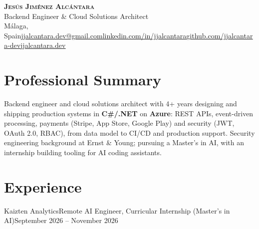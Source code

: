 \documentclass[a4paper,10pt]{article}
\begin{document}
\begin{center}
    \textbf{\Huge \scshape Jesús Jiménez Alcántara} \\ \vspace{2pt}
    {\large Backend Engineer \& Cloud Solutions Architect}\hspace{0.6em}{\textbar}\hspace{0.6em}{\normalsize .NET $\cdot$ Azure $\cdot$ DevOps $\cdot$ AI} \\ \vspace{3pt}
    {\footnotesize Málaga, Spain\cvsep\cvphoneitem\href{mailto:jjalcantara.dev@gmail.com}{\underline{jjalcantara.dev@gmail.com}}\cvsep\href{https://linkedin.com/in/jjalcantara}{\underline{linkedin.com/in/jjalcantara}}\cvsep\href{https://github.com/jjalcantara-dev}{\underline{github.com/jjalcantara-dev}}\cvsep\href{https://jjalcantara.dev}{\underline{jjalcantara.dev}}}
\end{center}

\vspace{-6pt}

\section{Professional Summary}
\small
Backend engineer and cloud solutions architect with 4+ years designing and shipping production systems in \textbf{C\#/.NET} on
\textbf{Azure}: REST APIs, event-driven processing, payments (Stripe, App Store, Google Play) and security (JWT, OAuth 2.0, RBAC),
from data model to CI/CD and production support. Security engineering background at Ernst \& Young; pursuing a Master's in AI,
with an internship building tooling for AI coding assistants.

\vspace{-2pt}

\section{Experience}
  \resumeSubHeadingListStart

    \resumeSubheading
      {Kaizten Analytics}{Remote}
      {AI Engineer, Curricular Internship (Master's in AI)}{September 2026 -- November 2026}
    \resumeItemListStart
    \resumeItemListEnd
\end{document}
